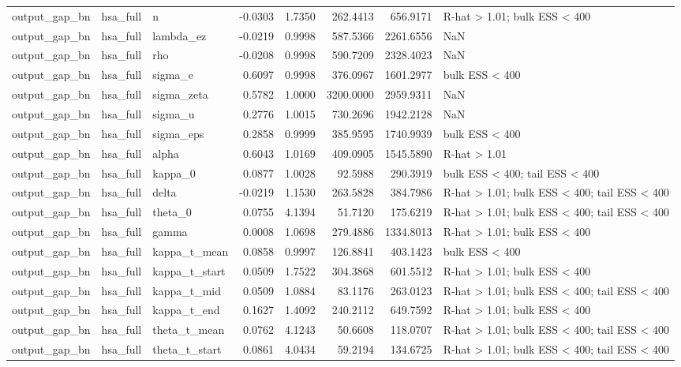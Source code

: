 \begin{tabular}{lllrrrrl}
output\_gap\_bn & hsa\_full & n & -0.0303 & 1.7350 & 262.4413 & 656.9171 & R-hat > 1.01; bulk ESS < 400 \\
output\_gap\_bn & hsa\_full & lambda\_ez & -0.0219 & 0.9998 & 587.5366 & 2261.6556 & NaN \\
output\_gap\_bn & hsa\_full & rho & -0.0208 & 0.9998 & 590.7209 & 2328.4023 & NaN \\
output\_gap\_bn & hsa\_full & sigma\_e & 0.6097 & 0.9998 & 376.0967 & 1601.2977 & bulk ESS < 400 \\
output\_gap\_bn & hsa\_full & sigma\_zeta & 0.5782 & 1.0000 & 3200.0000 & 2959.9311 & NaN \\
output\_gap\_bn & hsa\_full & sigma\_u & 0.2776 & 1.0015 & 730.2696 & 1942.2128 & NaN \\
output\_gap\_bn & hsa\_full & sigma\_eps & 0.2858 & 0.9999 & 385.9595 & 1740.9939 & bulk ESS < 400 \\
output\_gap\_bn & hsa\_full & alpha & 0.6043 & 1.0169 & 409.0905 & 1545.5890 & R-hat > 1.01 \\
output\_gap\_bn & hsa\_full & kappa\_0 & 0.0877 & 1.0028 & 92.5988 & 290.3919 & bulk ESS < 400; tail ESS < 400 \\
output\_gap\_bn & hsa\_full & delta & -0.0219 & 1.1530 & 263.5828 & 384.7986 & R-hat > 1.01; bulk ESS < 400; tail ESS < 400 \\
output\_gap\_bn & hsa\_full & theta\_0 & 0.0755 & 4.1394 & 51.7120 & 175.6219 & R-hat > 1.01; bulk ESS < 400; tail ESS < 400 \\
output\_gap\_bn & hsa\_full & gamma & 0.0008 & 1.0698 & 279.4886 & 1334.8013 & R-hat > 1.01; bulk ESS < 400 \\
output\_gap\_bn & hsa\_full & kappa\_t\_mean & 0.0858 & 0.9997 & 126.8841 & 403.1423 & bulk ESS < 400 \\
output\_gap\_bn & hsa\_full & kappa\_t\_start & 0.0509 & 1.7522 & 304.3868 & 601.5512 & R-hat > 1.01; bulk ESS < 400 \\
output\_gap\_bn & hsa\_full & kappa\_t\_mid & 0.0509 & 1.0884 & 83.1176 & 263.0123 & R-hat > 1.01; bulk ESS < 400; tail ESS < 400 \\
output\_gap\_bn & hsa\_full & kappa\_t\_end & 0.1627 & 1.4092 & 240.2112 & 649.7592 & R-hat > 1.01; bulk ESS < 400 \\
output\_gap\_bn & hsa\_full & theta\_t\_mean & 0.0762 & 4.1243 & 50.6608 & 118.0707 & R-hat > 1.01; bulk ESS < 400; tail ESS < 400 \\
output\_gap\_bn & hsa\_full & theta\_t\_start & 0.0861 & 4.0434 & 59.2194 & 134.6725 & R-hat > 1.01; bulk ESS < 400; tail ESS < 400 \\

\end{tabular}
